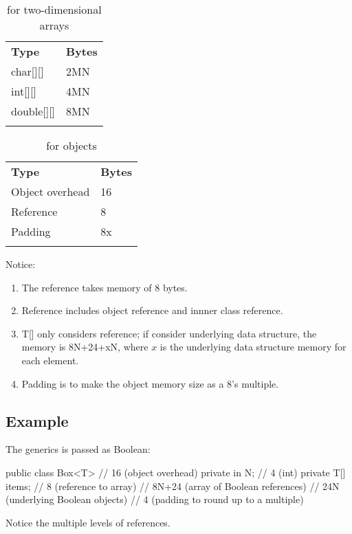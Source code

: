 \begin{table}
\begin{tabular}{ll}
\hline\noalign{\smallskip}
\textbf{Type} & \textbf{Bytes} \\
\noalign{\smallskip}\hline\noalign{\smallskip}

char[][] & 2MN \\
int[][] & 4MN \\
double[][] & 8MN \\

\noalign{\smallskip}\hline\noalign{\smallskip}
\end{tabular}
\caption{for two-dimensional arrays}
\end{table}

\begin{table}
\begin{tabular}{ll}
\hline\noalign{\smallskip}
\textbf{Type} & \textbf{Bytes} \\
\noalign{\smallskip}\hline\noalign{\smallskip}

Object overhead & 16 \\
Reference & 8 \\
Padding & 8x \\

\noalign{\smallskip}\hline\noalign{\smallskip}
\end{tabular}
\caption{for objects}
\end{table}

Notice:
\begin{enumerate}
\item The reference takes memory of 8 bytes. 
\item Reference includes object reference and innner class reference.
\item T[] only considers reference; if consider underlying data structure, the memory is 8N+24+xN, where $x$ is the underlying data structure memory for each element.
\item Padding is to make the object memory size as a 8's multiple.
\end{enumerate}

\subsection{Example}
The generics is passed as Boolean:
\begin{java}
public class Box<T> {   // 16 (object overhead)
    private in N;       // 4 (int)
    private T[] items;  // 8 (reference to array)
                        // 8N+24 (array of Boolean references)
                        // 24N (underlying Boolean objects)
                        // 4 (padding to round up to a multiple)
}
\end{java} 

Notice the multiple levels of references. 
